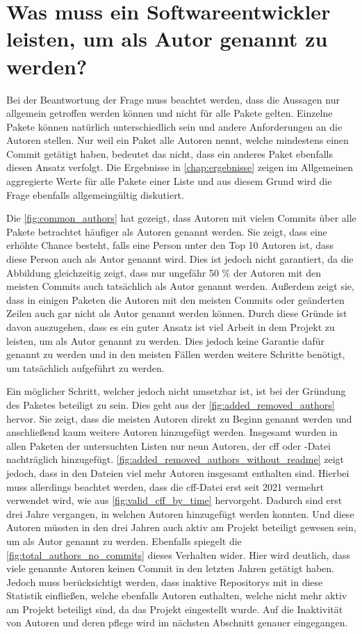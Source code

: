 \section{Was muss ein Softwareentwickler leisten, um als Autor genannt zu werden?}
\label{sec:zitationsfaehiger_autor_diskussion}
Bei der Beantwortung der Frage muss beachtet werden, dass die Aussagen nur allgemein getroffen werden können und nicht für alle Pakete gelten.
Einzelne Pakete können natürlich unterschiedlich sein und andere Anforderungen an die Autoren stellen.
Nur weil ein Paket alle Autoren nennt, welche mindestens einen Commit getätigt haben, bedeutet das nicht, dass ein anderes Paket ebenfalls diesen Ansatz verfolgt.
Die Ergebnisse in \autoref{chap:ergebnisse} zeigen im Allgemeinen aggregierte Werte für alle Pakete einer Liste und aus diesem Grund wird die Frage ebenfalls allgemeingültig diskutiert.

Die \autoref{fig:common_authors} hat gezeigt, dass Autoren mit vielen Commits über alle Pakete betrachtet häufiger als Autoren genannt werden.
Sie zeigt, dass eine erhöhte Chance besteht, falls eine Person unter den Top 10 Autoren ist, dass diese Person auch als Autor genannt wird.
Dies ist jedoch nicht garantiert, da die Abbildung gleichzeitig zeigt, dass nur ungefähr 50 \% der Autoren mit den meisten Commits auch tatsächlich als Autor genannt werden.
Außerdem zeigt sie, dass in einigen Paketen die Autoren mit den meisten Commits oder geänderten Zeilen auch gar nicht als Autor genannt werden können.
Durch diese Gründe ist davon auszugehen, dass es ein guter Ansatz ist viel Arbeit in dem Projekt zu leisten, um als Autor genannt zu werden.
Dies jedoch keine Garantie dafür genannt zu werden und in den meisten Fällen werden weitere Schritte benötigt, um tatsächlich aufgeführt zu werden.

Ein möglicher Schritt, welcher jedoch nicht umsetzbar ist, ist bei der Gründung des Paketes beteiligt zu sein.
Dies geht aus der \autoref{fig:added_removed_authors} hervor.
Sie zeigt, dass die meisten Autoren direkt zu Beginn genannt werden und anschließend kaum weitere Autoren hinzugefügt werden.
Insgesamt wurden in allen Paketen der untersuchten Listen nur neun Autoren, der \gls{cff} oder -Datei nachträglich hinzugefügt.
\autoref{fig:added_removed_authors_without_readme} zeigt jedoch, dass in den Dateien viel mehr Autoren insgesamt enthalten sind.
Hierbei muss allerdings beachtet werden, dass die \gls{cff}-Datei erst seit 2021 vermehrt verwendet wird, wie aus \autoref{fig:valid_cff_by_time} hervorgeht.
Dadurch sind erst drei Jahre vergangen, in welchen Autoren hinzugefügt werden konnten.
Und diese Autoren müssten in den drei Jahren auch aktiv am Projekt beteiligt gewesen sein, um als Autor genannt zu werden.
Ebenfalls spiegelt die \autoref{fig:total_authors_no_commits} dieses Verhalten wider.
Hier wird deutlich, dass viele genannte Autoren keinen Commit in den letzten Jahren getätigt haben.
Jedoch muss berücksichtigt werden, dass inaktive Repositorys mit in diese Statistik einfließen, welche ebenfalls Autoren enthalten, welche nicht mehr aktiv am Projekt beteiligt sind, da das Projekt eingestellt wurde.
Auf die Inaktivität von Autoren und deren pflege wird im nächsten Abschnitt genauer eingegangen.

